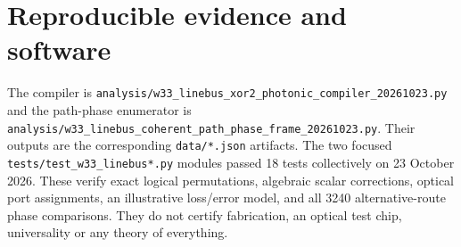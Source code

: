 \documentclass[10pt]{article}
\begin{document}
\section{Reproducible evidence and software}
The compiler is
\texttt{analysis/w33\_linebus\_xor2\_photonic\_compiler\_20261023.py}
and the path-phase enumerator is
\texttt{analysis/w33\_linebus\_coherent\_path\_phase\_frame\_20261023.py}.
Their outputs are the corresponding \texttt{data/*.json} artifacts.
The two focused \texttt{tests/test\_w33\_linebus*.py} modules
passed 18 tests collectively on 23 October 2026. These
verify exact logical permutations, algebraic scalar
corrections, optical port assignments, an illustrative
loss/error model, and all 3240 alternative-route phase
comparisons. They do not certify fabrication, an optical
test chip, universality or any theory of everything.
\end{document}

